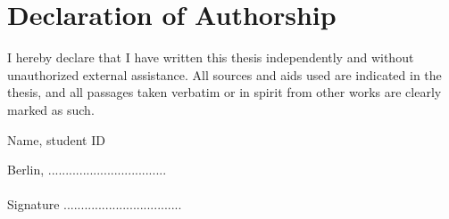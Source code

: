 \newpage

\thispagestyle{empty}

\chapter*{Declaration of Authorship}
\vspace*{1cm}

\noindent
I hereby declare that I have written this thesis independently and without unauthorized external assistance. All sources and aids used are indicated in the thesis, and all passages taken verbatim or in spirit from other works are clearly marked as such.

\vspace{2cm}
\noindent
Name, student ID\\
\vspace{0.5cm}

\noindent
Berlin, ..................................\\
\vspace{1cm}\\
Signature ..................................
\vspace{3cm}
